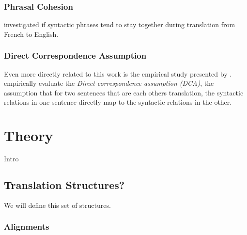 \documentclass{report}
\theoremstyle{indented}
\begin{document}
\subsection{Phrasal Cohesion}


\cite{fox2002phrasal} investigated if syntactic phrases tend to stay together during translation from French to English.


\subsection{Direct Correspondence Assumption}

Even more directly related to this work is the empirical study presented by \cite{hwa2002evaluating}. \citeauthor{hwa2002evaluating} empirically evaluate the \textit{Direct correspondence assumption (DCA)}, the assumption that for two sentences that are each others translation, the syntactic relations in one sentence directly map to the syntactic relations in the other. %





\chapter{Theory}

Intro 


\section{Translation Structures?}

We will define this set of structures.

\subsection{Alignments}
\end{document}

